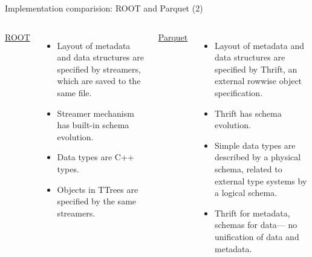 \documentclass[aspectratio=169]{beamer}
\begin{document}
\begin{frame}{Implementation comparision: ROOT and Parquet (2)}
\vspace{0.5 cm}
\begin{columns}[t]
{\large \underline{ROOT}}

\begin{itemize}
\item Layout of metadata and data structures are specified by streamers, which are saved to the same file.

\item Streamer mechanism has built-in schema evolution.

\item Data types are C++ types. \mbox{\hspace{5 cm}} \mbox{\hspace{5 cm}}

\item Objects in TTrees are specified by the same streamers.
\end{itemize}

{\large \underline{Parquet}}

\begin{itemize}
\item Layout of metadata and data structures are specified by Thrift, an external rowwise object specification.

\item Thrift has schema evolution. \mbox{\hspace{5 cm}}

\item Simple data types are described by a physical schema, related to external type systems by a logical schema.

\item Thrift for metadata, schemas for data--- no unification of data and metadata.
\end{itemize}
\end{columns}
\end{frame}
\end{document}
